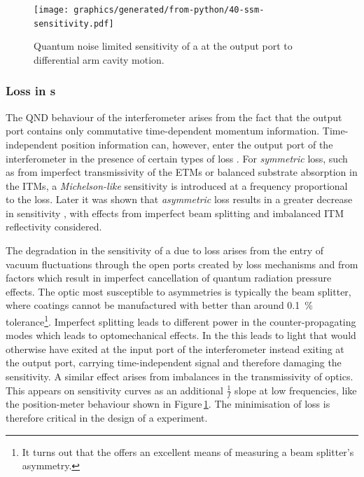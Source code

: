 \begin{figure}
  \centering
  \texttt{[image: graphics/generated/from-python/40-ssm-sensitivity.pdf]}
  \caption[Sensitivity of a \SSM{} at the output port to differential arm cavity motion]{\label{fig:ssm-sensitivity}Quantum noise limited sensitivity of a \SSM{} at the output port to differential arm cavity motion.}
\end{figure}

\subsubsection{Loss in \SSM{}s}
The \gls{QND} behaviour of the interferometer arises from the fact that the output port contains only commutative time-dependent momentum information. Time-independent position information can, however, enter the output port of the interferometer in the presence of certain types of loss \cite{Danilishin2004}. For \emph{symmetric} loss, such as from imperfect transmissivity of the \glspl{ETM} or balanced substrate absorption in the \glspl{ITM}, a \emph{Michelson-like} sensitivity is introduced at a frequency proportional to the loss. Later it was shown that \emph{asymmetric} loss results in a greater decrease in sensitivity \cite{Danilishin2015}, with effects from imperfect beam splitting and imbalanced \gls{ITM} reflectivity considered.

The degradation in the sensitivity of a \SSM{} due to loss arises from the entry of vacuum fluctuations through the open ports created by loss mechanisms and from factors which result in imperfect cancellation of quantum radiation pressure effects. The optic most susceptible to asymmetries is typically the beam splitter, where coatings cannot be manufactured with better than around \SI{0.1}{\percent} tolerance\footnote{It turns out that the \SSM{} offers an excellent means of measuring a beam splitter's asymmetry.}. Imperfect splitting leads to different power in the counter-propagating modes which leads to optomechanical effects. In the \SSM{} this leads to light that would otherwise have exited at the input port of the interferometer instead exiting at the output port, carrying time-independent signal and therefore damaging the sensitivity. A similar effect arises from imbalances in the transmissivity of optics. This appears on sensitivity curves as an additional $\frac{1}{f}$ slope at low frequencies, like the position-meter behaviour shown in Figure\,\ref{fig:ssm-sensitivity}. The minimisation of loss is therefore critical in the design of a \SSM{} experiment.

